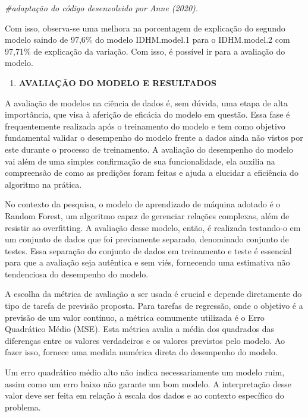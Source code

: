 \documentclass[
]{article}
\newenvironment{Shaded}{\begin{snugshade}}{\end{snugshade}}
\newcommand{\CommentTok}[1]{\textcolor[rgb]{0.56,0.35,0.01}{\textit{#1}}}
\providecommand{\tightlist}{%
  \setlength{\itemsep}{0pt}\setlength{\parskip}{0pt}}
\begin{document}
\begin{Shaded}
\begin{Highlighting}[]
\CommentTok{\#adaptação do código desenvolvido por Anne (2020).}
\end{Highlighting}
\end{Shaded}

Com isso, observa-se uma melhora na porcentagem de explicação do segundo
modelo saindo de 97,6\% do modelo IDHM.model.1 para o IDHM.model.2 com
97,71\% de explicação da variação. Com isso, é possível ir para a
avaliação do modelo.

\begin{enumerate}
\def\labelenumi{\arabic{enumi}.}
\setcounter{enumi}{4}
\tightlist
\item
  \textbf{AVALIAÇÃO DO MODELO E RESULTADOS}
\end{enumerate}

A avaliação de modelos na ciência de dados é, sem dúvida, uma etapa de
alta importância, que visa à aferição de eficácia do modelo em questão.
Essa fase é frequentemente realizada após o treinamento do modelo e tem
como objetivo fundamental validar o desempenho do modelo frente a dados
ainda não vistos por este durante o processo de treinamento. A avaliação
do desempenho do modelo vai além de uma simples confirmação de sua
funcionalidade, ela auxilia na compreensão de como as predições foram
feitas e ajuda a elucidar a eficiência do algoritmo na prática.

No contexto da pesquisa, o modelo de aprendizado de máquina adotado é o
Random Forest, um algoritmo capaz de gerenciar relações complexas, além
de resistir ao overfitting. A avaliação desse modelo, então, é realizada
testando-o em um conjunto de dados que foi previamente separado,
denominado conjunto de testes. Essa separação do conjunto de dados em
treinamento e teste é essencial para que a avaliação seja autêntica e
sem viés, fornecendo uma estimativa não tendenciosa do desempenho do
modelo.

A escolha da métrica de avaliação a ser usada é crucial e depende
diretamente do tipo de tarefa de previsão proposta. Para tarefas de
regressão, onde o objetivo é a previsão de um valor contínuo, a métrica
comumente utilizada é o Erro Quadrático Médio (MSE). Esta métrica avalia
a média dos quadrados das diferenças entre os valores verdadeiros e os
valores previstos pelo modelo. Ao fazer isso, fornece uma medida
numérica direta do desempenho do modelo.

Um erro quadrático médio alto não indica necessariamente um modelo ruim,
assim como um erro baixo não garante um bom modelo. A interpretação
desse valor deve ser feita em relação à escala dos dados e ao contexto
específico do problema.
\end{document}
